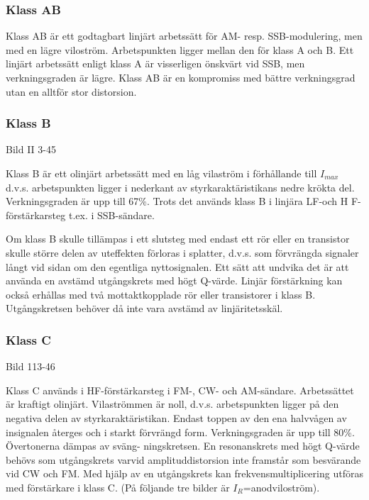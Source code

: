 \subsubsection{Klass AB}

Klass AB är ett godtagbart linjärt arbetssätt för AM-
resp. SSB-modulering, men med en lägre viloström. Arbetspunkten ligger
mellan den för klass A och B. Ett linjärt arbetssätt enligt klass A är
visserligen önskvärt vid SSB, men verkningsgraden är lägre. Klass AB
är en kompromiss med bättre verkningsgrad utan en alltför stor
distorsion.

\subsubsection{Klass B}

Bild II 3-45

Klass B är ett olinjärt arbetssätt med en låg vilaström i förhållande
till \(I_{max}\) d.v.s. arbetspunkten ligger i nederkant av
styrkaraktäristikans nedre krökta del. Verkningsgraden är upp till
67\%. Trots det används klass B i linjära LF-och H F-förstärkarsteg
t.ex. i SSB-sändare.

Om klass B skulle tillämpas i ett slutsteg med endast ett rör eller en
transistor skulle större delen av uteffekten förloras i splatter,
d.v.s. som förvrängda signaler långt vid sidan om den egentliga
nyttosignalen. Ett sätt att undvika det är att använda en avstämd
utgångskrets med högt Q-värde. Linjär förstärkning kan också erhållas
med två mottaktkopplade rör eller transistorer i klass B.
Utgångskretsen behöver då inte vara avstämd av linjäritetsskäl.

\subsubsection{Klass C}

Bild 113-46

Klass C används i HF-förstärkarsteg i FM-, CW- och
AM-sändare. Arbetssättet är kraftigt olinjärt. Vilaströmmen är noll,
d.v.s. arbetspunkten ligger på den negativa delen av
styrkaraktäristikan. Endast toppen av den ena halvvågen av insignalen
återges och i starkt förvrängd form. Verkningsgraden är upp till
80\%. Övertonerna dämpas av sväng- ningskretsen. En resonanskrets med
högt Q-värde behövs som utgångskrets varvid amplituddistorsion inte
framstår som besvärande vid CW och FM. Med hjälp av en utgångskrets
kan frekvensmultiplicering utföras med förstärkare i klass C.  (På
följande tre bilder är \(I_R\)=anodviloström).

